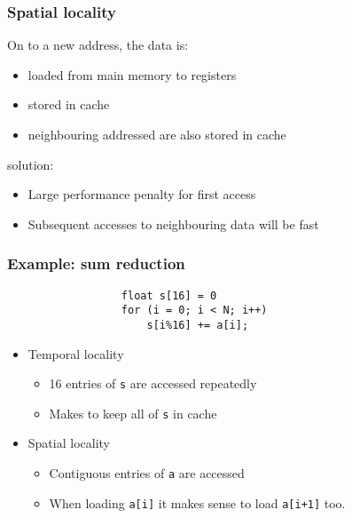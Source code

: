 \documentclass[dvipsnames,presentation,aspectratio=169,14pt]{beamer}
\begin{document}
\begin{frame}[fragile]
  \frametitle{Spatial locality}
  On  to a new address, the data is:\\[-13pt]
  \begin{itemize}[itemsep=6pt]
  \item loaded from main memory to registers
  \item stored in cache
  \item neighbouring addressed are also stored in cache
  \end{itemize}

  \vskip 20pt
  \pause

   solution:\\[-13pt]
  \begin{itemize}[itemsep=6pt]
  \item Large performance penalty for first access
  \item Subsequent accesses to neighbouring data will be fast
  \end{itemize}

\end{frame}

\begin{frame}[fragile]
  \frametitle{Example: sum reduction}
\begin{verbatim}
                  float s[16] = 0
                  for (i = 0; i < N; i++)
                      s[i%16] += a[i];
\end{verbatim}

  \vskip 15pt

  \begin{itemize}[itemsep=6pt]
  \item Temporal locality
    \begin{itemize}[itemsep=4pt]
    \item 16 entries of \texttt{s} are accessed repeatedly
    \item Makes to keep all of \texttt{s} in cache
    \end{itemize}
  \item Spatial locality
    \begin{itemize}[itemsep=4pt]
    \item Contiguous entries of \texttt{a} are accessed
    \item When loading \texttt{a[i]} it makes sense to load \texttt{a[i+1]} too.
    \end{itemize}
  \end{itemize}
\end{frame}
\end{document}
